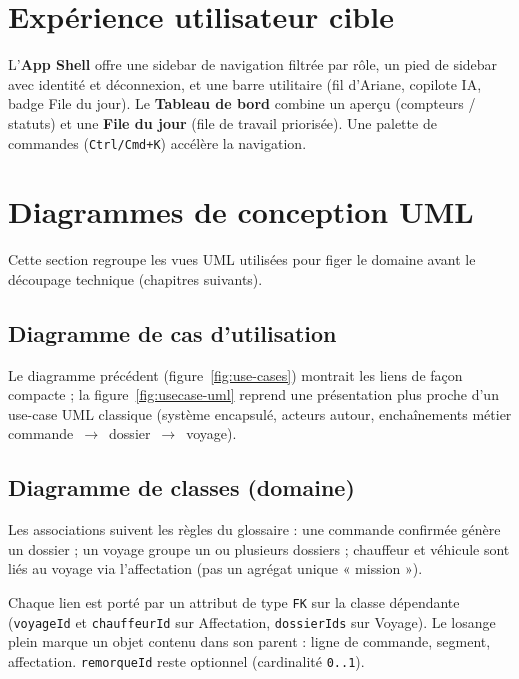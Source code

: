 \section{Expérience utilisateur cible}

L'\textbf{App Shell} offre une sidebar de navigation filtrée par rôle, un pied de sidebar avec identité et déconnexion, et une barre utilitaire (fil d'Ariane, copilote IA, badge File du jour). Le \textbf{Tableau de bord} combine un aperçu (compteurs / statuts) et une \textbf{File du jour} (file de travail priorisée). Une palette de commandes (\texttt{Ctrl/Cmd+K}) accélère la navigation.

\section{Diagrammes de conception UML}

Cette section regroupe les vues UML utilisées pour figer le domaine avant le découpage technique (chapitres suivants).

\subsection{Diagramme de cas d'utilisation}


Le diagramme précédent (figure~\ref{fig:use-cases}) montrait les liens de façon compacte ; la figure~\ref{fig:usecase-uml} reprend une présentation plus proche d'un use-case UML classique (système encapsulé, acteurs autour, enchaînements métier commande~$\rightarrow$~dossier~$\rightarrow$~voyage).

\subsection{Diagramme de classes (domaine)}


Les associations suivent les règles du glossaire : une commande confirmée génère un dossier ; un voyage groupe un ou plusieurs dossiers ; chauffeur et véhicule sont liés au voyage via l'affectation (pas un agrégat unique « mission »).

Chaque lien est porté par un attribut de type \texttt{FK} sur la classe dépendante (\texttt{voyageId} et \texttt{chauffeurId} sur Affectation, \texttt{dossierIds} sur Voyage). Le losange plein marque un objet contenu dans son parent : ligne de commande, segment, affectation. \texttt{remorqueId} reste optionnel (cardinalité \texttt{0..1}).

